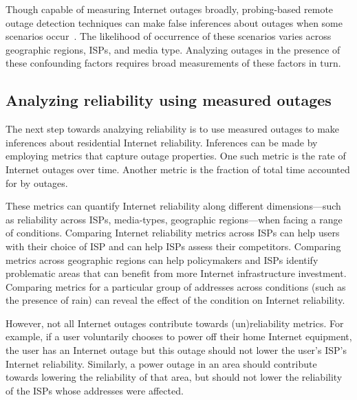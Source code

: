 

Though capable of measuring Internet outages broadly, probing-based remote outage detection techniques can
make false inferences about outages when some scenarios
occur~\cite{timeouts, addrchange-reasons}. The likelihood of
occurrence of these scenarios varies across geographic regions,
ISPs, and media type. Analyzing outages in the presence of these
confounding factors requires broad measurements of these factors in turn.

\subsection{Analyzing reliability using measured outages}

The next step towards analzying reliability is to use measured outages
to make inferences about residential Internet reliability. Inferences
can be made by employing metrics that capture outage properties. One such
metric is the rate of Internet outages over time. Another
metric is the fraction of total time accounted for by outages. 

These metrics can quantify Internet reliability along different
dimensions---such as reliability across ISPs, media-types, geographic
regions---when facing a range of conditions. Comparing Internet
reliability metrics across ISPs can help users with their choice of ISP and
can help ISPs assess their competitors. Comparing metrics across geographic
regions can help policymakers and ISPs identify problematic areas that
can benefit from more Internet infrastructure investment. Comparing
metrics for a particular group of addresses across conditions (such as
the presence of rain) can reveal the effect of the condition on
Internet reliability.

However, not all Internet outages contribute towards
(un)reliability metrics. For example, if a user voluntarily chooses to power
off their home Internet equipment, the user has an Internet outage but
this outage should not lower the user's ISP's Internet reliability. Similarly, a power
outage in an area should contribute towards lowering the reliability
of that area, but should not lower the reliability of the
ISPs whose addresses were affected. 

